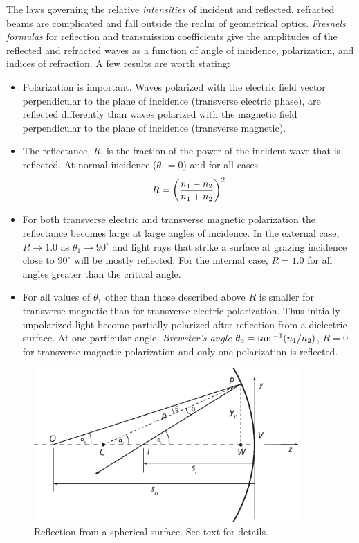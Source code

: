 The laws governing the relative {\it intensities} of incident and
reflected, refracted beams are complicated and fall outside the realm
of geometrical optics. {\it Fresnels formulas} for reflection and
transmission coefficients give the amplitudes of the reflected and
refracted waves as a function of angle of incidence, polarization, and
indices of refraction. A few results are worth stating:
\begin{itemize}
\item Polarization is important. Waves polarized with the electric
  field vector perpendicular to the plane of incidence (transverse
  electric phase), are reflected differently than waves polarized with
  the magnetic field perpendicular to the plane of incidence
  (transverse magnetic).
\item The reflectance, $R$, is the fraction of the power of the
  incident wave that is reflected. At normal incidence ($\theta_1=0$)
  and for all cases \[ R=\left({n_1-n_2\over n_1+n_2}\right)^2 \]
\item For both transverse electric and transverse magnetic
  polarization the reflectance becomes large at large angles of
  incidence. In the external case, $R\rightarrow 1.0$ as
  $\theta_1\rightarrow 90^{\circ}$ and light rays that strike a
  surface at grazing incidence close to $90^{\circ}$ will be mostly
  reflected. For the internal case, $R=1.0$ for all angles greater
  than the critical angle.
\item For all values of $\theta_1$ other than those described above
  $R$ is smaller for transverse magnetic than for transverse electric
  polarization. Thus initially unpolarized light become partially
  polarized after reflection from a dielectric surface. At one
  particular angle, {\it Brewster's angle} $\theta_{\rm
    p}=\tan{^{-1}({n_1/n_2})}$, $R=0$ for transverse magnetic
  polarization and only one polarization is reflected.
\end{itemize}

\begin{figure}[th]
	\centering
	\includegraphics[width=0.9\textwidth]{reflection_spherical.eps}
  \caption{Reflection from a spherical surface. See text for details. }
  \label{fig:reflection_spherical}
\end{figure}


